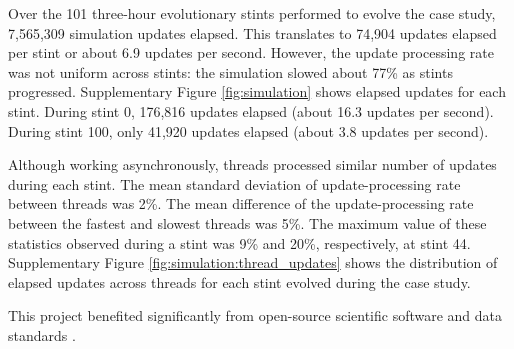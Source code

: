 Over the 101 three-hour evolutionary stints performed to evolve the case study, 7,565,309 simulation updates elapsed.
This translates to 74,904 updates elapsed per stint or about 6.9 updates per second.
However, the update processing rate was not uniform across stints: the simulation slowed about 77\% as stints progressed.
Supplementary Figure \ref{fig:simulation} shows elapsed updates for each stint.
During stint 0, 176,816 updates elapsed (about 16.3 updates per second).
During stint 100, only 41,920 updates elapsed (about 3.8 updates per second).

Although working asynchronously, threads processed similar number of updates during each stint.
The mean standard deviation of update-processing rate between threads was 2\%.
The mean difference of the update-processing rate between the fastest and slowest threads was 5\%.
The maximum value of these statistics observed during a stint was 9\% and 20\%, respectively, at stint 44.
Supplementary Figure \ref{fig:simulation:thread_updates} shows the distribution of elapsed updates across threads for each stint evolved during the case study.

This project benefited significantly from open-source scientific software and data standards \citep{2020SciPy-NMeth,harris2020array,reback2020pandas,mckinney-proc-scipy-2010,waskom2021seaborn,hunter2007matplotlib,moreno2023teeplot,seabold2010statsmodels,vostinar2024empirical,moreno2021signalgp,10.1145/3449726.3463205,cock2009biopython,lalejini2019data}.
